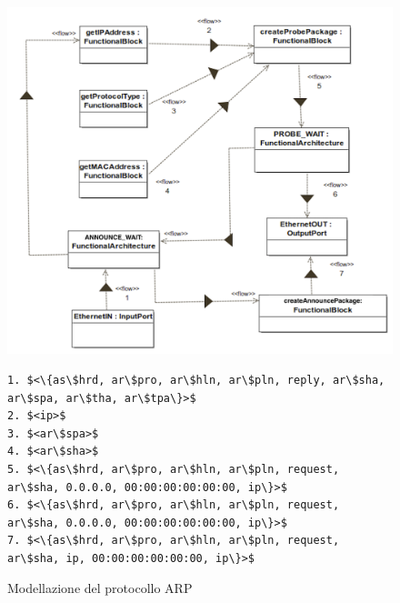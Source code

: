\begin{figure}[h!] 
    \centering 
    \includegraphics[scale=0.35]{../img/ARP/ARP.png}
    \begin{lstlisting}[frame=single, mathescape, basicstyle=\footnotesize]
1. $<\{as\$hrd, ar\$pro, ar\$hln, ar\$pln, reply, ar\$sha, ar\$spa, ar\$tha, ar\$tpa\}>$
2. $<ip>$
3. $<ar\$spa>$
4. $<ar\$sha>$
5. $<\{as\$hrd, ar\$pro, ar\$hln, ar\$pln, request, ar\$sha, 0.0.0.0, 00:00:00:00:00:00, ip\}>$
6. $<\{as\$hrd, ar\$pro, ar\$hln, ar\$pln, request, ar\$sha, 0.0.0.0, 00:00:00:00:00:00, ip\}>$
7. $<\{as\$hrd, ar\$pro, ar\$hln, ar\$pln, request, ar\$sha, ip, 00:00:00:00:00:00, ip\}>$
    \end{lstlisting}
    \caption{Modellazione del protocollo ARP} 
    \label{fig:ARP}
\end{figure}
\newpage
